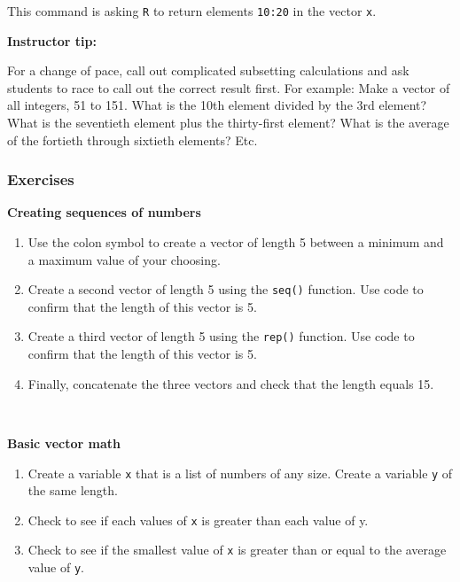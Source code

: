 \documentclass[
]{book}
\begin{document}
This command is asking \texttt{R} to return elements \texttt{10:20} in the vector \texttt{x}.

\leavevmode\hypertarget{tip-text}{}%
\textbf{Instructor tip:}

For a change of pace, call out complicated subsetting calculations and ask students to race to call out the correct result first. For example: Make a vector of all integers, 51 to 151. What is the 10th element divided by the 3rd element? What is the seventieth element plus the thirty-first element? What is the average of the fortieth through sixtieth elements? Etc.

\hypertarget{exercises-3}{%
\subsubsection*{Exercises}\label{exercises-3}}

\textbf{Creating sequences of numbers}

\begin{enumerate}
\def\labelenumi{\arabic{enumi}.}
\item
  Use the colon symbol to create a vector of length 5 between a minimum and a maximum value of your choosing.
\item
  Create a second vector of length 5 using the \texttt{seq()} function. Use code to confirm that the length of this vector is 5.
\item
  Create a third vector of length 5 using the \texttt{rep()} function. Use code to confirm that the length of this vector is 5.
\item
  Finally, concatenate the three vectors and check that the length equals 15.
\end{enumerate}

~

\textbf{Basic vector math}

\begin{enumerate}
\def\labelenumi{\arabic{enumi}.}
\setcounter{enumi}{4}
\item
  Create a variable \texttt{x} that is a list of numbers of any size. Create a variable \texttt{y} of the same length.
\item
  Check to see if each values of \texttt{x} is greater than each value of y.
\item
  Check to see if the smallest value of \texttt{x} is greater than or equal to the average value of \texttt{y}.
\end{enumerate}
\end{document}
